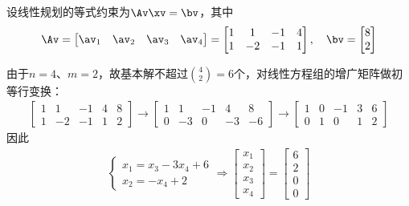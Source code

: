 \documentclass{ctexart}
\begin{document}
\begin{example}
    设线性规划的等式约束为$\Av \xv = \bv$，其中
    \begin{align*}
        \Av = \begin{bmatrix}
                  \av_1 & \av_2 & \av_3 & \av_4
              \end{bmatrix} =
        \begin{bmatrix}
            1 & 1 & -1 & 4 \\ 1 & -2 & -1 & 1
        \end{bmatrix}, \quad \bv =
        \begin{bmatrix}
            8 \\ 2
        \end{bmatrix}
    \end{align*}

    由于$n=4$、$m=2$，故基本解不超过$\binom{4}{2}=6$个，对线性方程组的增广矩阵做初等行变换：
    \begin{align*}
        \begin{bmatrix}
            1 & 1  & -1 & 4 & 8 \\
            1 & -2 & -1 & 1 & 2
        \end{bmatrix} \longrightarrow
        \begin{bmatrix}
            1 & 1  & -1 & 4  & 8  \\
            0 & -3 & 0  & -3 & -6
        \end{bmatrix} \longrightarrow
        \begin{bmatrix}
            1 & 0 & -1 & 3 & 6 \\
            0 & 1 & 0  & 1 & 2
        \end{bmatrix}
    \end{align*}
    因此
    \begin{align*}
        \begin{cases}
            x_1 = x_3 - 3 x_4 + 6 \\
            x_2 = - x_4 + 2
        \end{cases} \Longrightarrow
        \begin{bmatrix}
            x_1 \\ x_2 \\ x_3 \\ x_4
        \end{bmatrix} =
        \begin{bmatrix}
            6 \\ 2 \\ 0 \\ 0

\end{bmatrix}
\end{align*}
\end{example}
\end{document}
